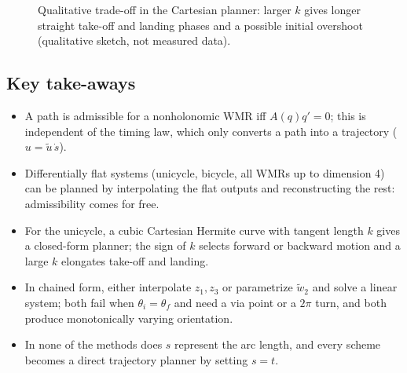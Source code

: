 \documentclass[11pt,a4paper]{article}
\def\boldsymbol#1{#1}%
\newcommand{\q}{\boldsymbol{q}}
\newcommand{\ut}{\tilde{\boldsymbol{u}}}
\newcommand{\wwt}{\tilde w}
\theoremstyle{definition}
\theoremstyle{plain}
\theoremstyle{remark}
\begin{document}
\begin{figure}[h]
\centering
{}
\caption{Qualitative trade-off in the Cartesian planner: larger $k$ gives longer straight take-off and landing phases and
a possible initial overshoot (qualitative sketch, not measured data).}
\end{figure}

\subsection*{Key take-aways}
\begin{itemize}
\item A path is admissible for a nonholonomic WMR iff $A(\q)\q'=0$; this is independent of the timing law, which only
converts a path into a trajectory ($\boldsymbol u=\ut\,\dot s$).
\item Differentially flat systems (unicycle, bicycle, all WMRs up to dimension 4) can be planned by interpolating the flat outputs
and reconstructing the rest: admissibility comes for free.
\item For the unicycle, a cubic Cartesian Hermite curve with tangent length $k$ gives a closed-form planner; the sign of $k$ selects
forward or backward motion and a large $k$ elongates take-off and landing.
\item In chained form, either interpolate $z_1,z_3$ or parametrize $\wwt_2$ and solve a linear system; both fail when
$\theta_i=\theta_f$ and need a via point or a $2\pi$ turn, and both produce monotonically varying orientation.
\item In none of the methods does $s$ represent the arc length, and every scheme becomes a direct trajectory planner by
setting $s=t$.
\end{itemize}

\newpage

\setcounter{section}{0}
\renewcommand{\thesection}{\arabic{section}}
\end{document}
